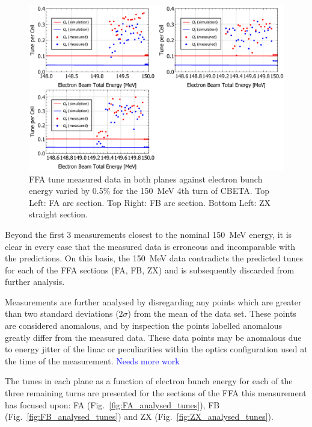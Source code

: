 \documentclass[../main.tex]{subfiles}
\begin{document}
\begin{figure}[!h]
\centering
\includegraphics[width=\textwidth]{Figures/CBETA_Multi-Pass_Commissioning/FAFBZX_150_tunes.pdf}
\caption{FFA tune measured data in both planes against electron bunch energy varied by 0.5\% for the 150~\si{\mega\electronvolt} 4th turn of CBETA. Top Left: FA arc section. Top Right: FB arc section. Bottom Left: ZX straight section.}
\label{fig:FAFBZX_150MeV_tunes}
\end{figure}

Beyond the first 3 measurements closest to the nominal 150~\si{\mega\electronvolt} energy, it is clear in every case that the measured data is erroneous and incomparable with the predictions. On this basis, the 150~\si{\mega\electronvolt} data contradicts the predicted tunes for each of the FFA sections (FA, FB, ZX) and is subsequently discarded from further analysis.

Measurements are further analysed by disregarding any points which are greater than two standard deviations ($2\sigma$) from the mean of the data set. These points are considered anomalous, and by inspection the points labelled anomalous greatly differ from the measured data. These data points may be anomalous due to energy jitter of the linac or peculiarities within the optics configuration used at the time of the measurement. \textcolor{blue}{Needs more work}

The tunes in each plane as a function of electron bunch energy for each of the three remaining turns are presented for the sections of the FFA this measurement has focused upon: FA (Fig.~\ref{fig:FA_analysed_tunes}), FB (Fig.~\ref{fig:FB_analysed_tunes}) and ZX (Fig.~\ref{fig:ZX_analysed_tunes}).
\end{document}
